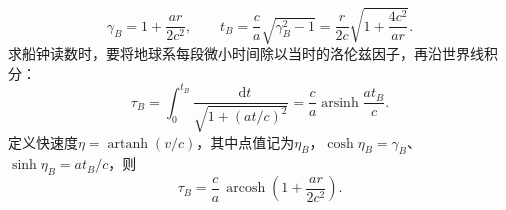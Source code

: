 \documentclass[UTF8,fontset=fandol,a4paper,11pt]{ctexart}
\newcommand{\dd}{\mathop{}\!\mathrm{d}}
\begin{document}
\[
\gamma_B=1+\frac{ar}{2c^2},\qquad
t_B=\frac ca\sqrt{\gamma_B^2-1}
=\frac r{2c}\sqrt{1+\frac{4c^2}{ar}}.
\]
求船钟读数时，要将地球系每段微小时间除以当时的洛伦兹因子，再沿世界线积分：
\[
\tau_B=\int_0^{t_B}\frac{\dd t}{\sqrt{1+(at/c)^2}}
=\frac ca\operatorname{arsinh}\frac{at_B}{c}.
\]
定义快速度$\eta=\operatorname{artanh}(v/c)$，其中点值记为$\eta_B$，$\cosh\eta_B=\gamma_B$、$\sinh\eta_B=at_B/c$，则
\[
\boxed{\tau_B=\frac ca\,\operatorname{arcosh}
\left(1+\frac{ar}{2c^2}\right)}.
\]
\begin{center}\begin{minipage}{.98\linewidth}\centering
{}
\end{minipage}
\end{center}
\end{document}
